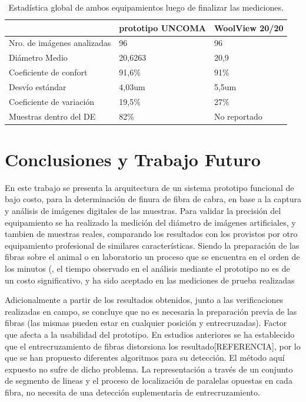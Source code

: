 \documentclass[runningheads,a4paper]{llncs}
\begin{document}
\begin{table}[htbp]
\begin{center}
\begin{tabular}{|l|l|l|}
\hline
& prototipo UNCOMA & WoolView 20/20 \\
\hline \hline \hline
Nro. de imágenes analizadas & 96 & 96 \\ \hline
Diámetro Medio & 20,6263 & 20,9 \\ \hline
Coeficiente de confort & 91,6\% & 91\% \\ \hline
Desvío estándar & 4,03um & 5,5um \\ \hline
Coeficiente de variación & 19,5\% & 27\% \\ \hline
Muestras dentro del DE & 82\% & No reportado \\ \hline
\end{tabular}
\caption{Estadística global de ambos equipamientos luego de finalizar las mediciones.}
\label{tabla:sencilla}
\end{center}
\end{table}


\section{Conclusiones y Trabajo Futuro}
En este trabajo se presenta la arquitectura de un sistema prototipo funcional
de bajo costo, para la determinación de finura de fibra de cabra, en
base a la captura y análisis de imágenes digitales de las muestras.
Para validar la precisión del equipamiento se ha realizado la medición
del diámetro de imágenes artificiales, y tambien de 
muestras reales, comparando los resultados con los provistos por
otro equipamiento profesional de similares características.
Siendo la preparación de las fibras sobre el animal o en laboratorio un proceso que se encuentra en el orden de los minutos (, el tiempo observado en el análisis mediante el prototipo no es de un costo significativo, y ha sido aceptado  en las mediciones de prueba realizadas 

Adicionalmente a partir de los resultados obtenidos, junto a las verificaciones realizadas en campo, se concluye que no es necesaria la preparación previa de las fibras (las mismas pueden estar en cualquier posición y entrecruzadas). Factor que afecta a la usabilidad del prototipo. 
En estudios anteriores se ha establecido que el entrecruzamiento de fibras distorsiona los resultado[REFERENCIA], por lo que se han propuesto diferentes algoritmos para su detección.
El método aquí expuesto no sufre de dicho problema. 
La representación a través de un conjunto de segmento de lineas y el proceso de localización de paralelas opuestas en cada fibra, no necesita de una detección suplementaria de entrecruzamiento. 
\end{document}
